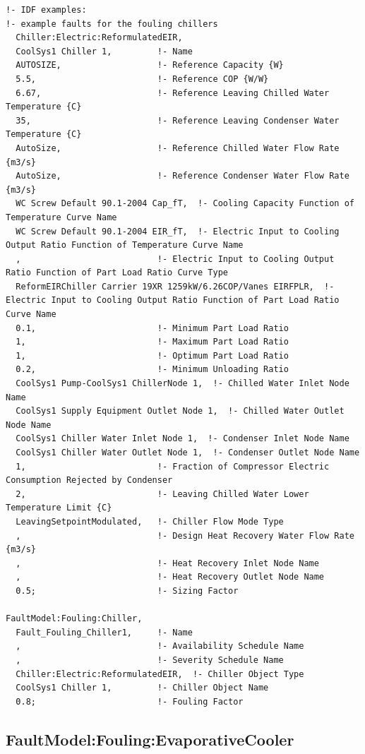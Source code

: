 \begin{lstlisting}
!- IDF examples:
!- example faults for the fouling chillers
  Chiller:Electric:ReformulatedEIR,
  CoolSys1 Chiller 1,         !- Name
  AUTOSIZE,                   !- Reference Capacity {W}
  5.5,                        !- Reference COP {W/W}
  6.67,                       !- Reference Leaving Chilled Water Temperature {C}
  35,                         !- Reference Leaving Condenser Water Temperature {C}
  AutoSize,                   !- Reference Chilled Water Flow Rate {m3/s}
  AutoSize,                   !- Reference Condenser Water Flow Rate {m3/s}
  WC Screw Default 90.1-2004 Cap_fT,  !- Cooling Capacity Function of Temperature Curve Name
  WC Screw Default 90.1-2004 EIR_fT,  !- Electric Input to Cooling Output Ratio Function of Temperature Curve Name
  ,                           !- Electric Input to Cooling Output Ratio Function of Part Load Ratio Curve Type
  ReformEIRChiller Carrier 19XR 1259kW/6.26COP/Vanes EIRFPLR,  !- Electric Input to Cooling Output Ratio Function of Part Load Ratio Curve Name
  0.1,                        !- Minimum Part Load Ratio
  1,                          !- Maximum Part Load Ratio
  1,                          !- Optimum Part Load Ratio
  0.2,                        !- Minimum Unloading Ratio
  CoolSys1 Pump-CoolSys1 ChillerNode 1,  !- Chilled Water Inlet Node Name
  CoolSys1 Supply Equipment Outlet Node 1,  !- Chilled Water Outlet Node Name
  CoolSys1 Chiller Water Inlet Node 1,  !- Condenser Inlet Node Name
  CoolSys1 Chiller Water Outlet Node 1,  !- Condenser Outlet Node Name
  1,                          !- Fraction of Compressor Electric Consumption Rejected by Condenser
  2,                          !- Leaving Chilled Water Lower Temperature Limit {C}
  LeavingSetpointModulated,   !- Chiller Flow Mode Type
  ,                           !- Design Heat Recovery Water Flow Rate {m3/s}
  ,                           !- Heat Recovery Inlet Node Name
  ,                           !- Heat Recovery Outlet Node Name
  0.5;                        !- Sizing Factor

FaultModel:Fouling:Chiller,
  Fault_Fouling_Chiller1,     !- Name
  ,                           !- Availability Schedule Name
  ,                           !- Severity Schedule Name
  Chiller:Electric:ReformulatedEIR,  !- Chiller Object Type
  CoolSys1 Chiller 1,         !- Chiller Object Name
  0.8;                        !- Fouling Factor
\end{lstlisting}


\subsection{FaultModel:Fouling:EvaporativeCooler}\label{faultmodelfoulingevapcooler}

